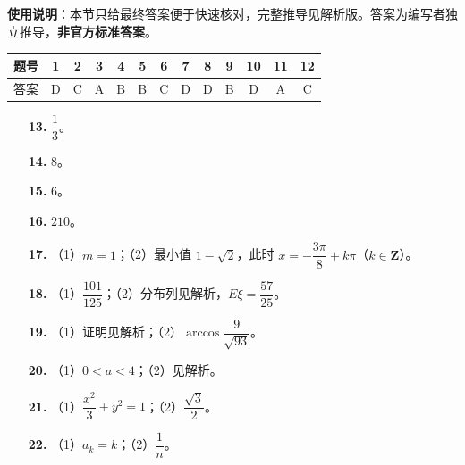
\begin{gknotice}
\textbf{使用说明}：本节只给最终答案便于快速核对，完整推导见解析版。答案为编写者独立推导，\textbf{非官方标准答案}。
\end{gknotice}

\begin{center}\begin{tabular}{ccccccccccccc}
\toprule
题号 & 1 & 2 & 3 & 4 & 5 & 6 & 7 & 8 & 9 & 10 & 11 & 12 \\
\midrule
答案 & D & C & A & B & B & C & D & D & B & D & A & C \\
\bottomrule
\end{tabular}\end{center}

\begin{itemize}[leftmargin=2.6em]
  \item[\textbf{13.}] $\dfrac13$。
  \item[\textbf{14.}] $8$。
  \item[\textbf{15.}] $6$。
  \item[\textbf{16.}] $210$。
\end{itemize}

\begin{itemize}[leftmargin=2.6em]
  \item[\textbf{17.}] （1）$m=1$；（2）最小值 $1-\sqrt2$，此时 $x=-\dfrac{3\pi}{8}+k\pi$（$k\in\mathbf Z$）。
  \item[\textbf{18.}] （1）$\dfrac{101}{125}$；（2）分布列见解析，$E\xi=\dfrac{57}{25}$。
  \item[\textbf{19.}] （1）证明见解析；（2）$\arccos\dfrac{9}{\sqrt{93}}$。
  \item[\textbf{20.}] （1）$0<a<4$；（2）见解析。
  \item[\textbf{21.}] （1）$\dfrac{x^2}{3}+y^2=1$；（2）$\dfrac{\sqrt3}{2}$。
  \item[\textbf{22.}] （1）$a_k=k$；（2）$\dfrac1n$。
\end{itemize}
